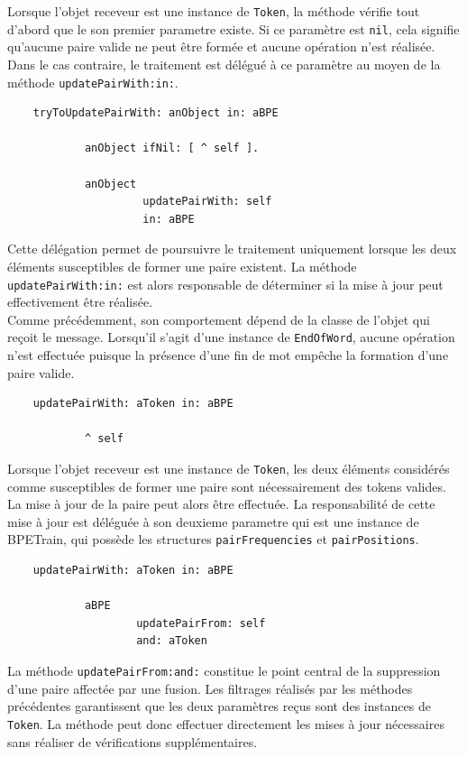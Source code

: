 \documentclass[12pt,a4paper]{report}
\begin{document}
	Lorsque l’objet receveur est une instance de \texttt{Token}, la méthode vérifie tout d’abord que le son premier parametre existe. Si ce paramètre est \texttt{nil}, cela signifie qu’aucune paire valide ne peut être formée et aucune opération n’est réalisée. Dans le cas contraire, le traitement est délégué à ce paramètre au moyen de la méthode \texttt{updatePairWith:in:}.
	
	\begin{verbatim}
	tryToUpdatePairWith: anObject in: aBPE
	
			anObject ifNil: [ ^ self ].
			
			anObject
					 updatePairWith: self
					 in: aBPE
	\end{verbatim}
	
	Cette délégation permet de poursuivre le traitement uniquement lorsque les deux éléments susceptibles de former une paire existent. La méthode \texttt{updatePairWith:in:} est alors responsable de déterminer si la mise à jour peut effectivement être réalisée.\\
	Comme précédemment, son comportement dépend de la classe de l’objet qui reçoit le message. Lorsqu’il s’agit d’une instance de \texttt{EndOfWord}, aucune opération n’est effectuée puisque la présence d’une fin de mot empêche la formation d’une paire valide.
	
	\begin{verbatim}
	updatePairWith: aToken in: aBPE
	
			^ self
	\end{verbatim}
	
	Lorsque l’objet receveur est une instance de \texttt{Token}, les deux éléments considérés comme susceptibles de former une paire sont nécessairement des tokens valides. La mise à jour de la paire peut alors être effectuée. La responsabilité de cette mise à jour est déléguée à son deuxieme parametre qui est une instance de BPETrain, qui possède les structures \texttt{pairFrequencies} et \texttt{pairPositions}.
	
	\begin{verbatim}
	updatePairWith: aToken in: aBPE
	
			aBPE
					updatePairFrom: self
					and: aToken
	\end{verbatim}
	
	La méthode \texttt{updatePairFrom:and:} constitue le point central de la suppression d’une paire affectée par une fusion. Les filtrages réalisés par les méthodes précédentes garantissent que les deux paramètres reçus sont des instances de \texttt{Token}. La méthode peut donc effectuer directement les mises à jour nécessaires sans réaliser de vérifications supplémentaires.
	
\end{document}
